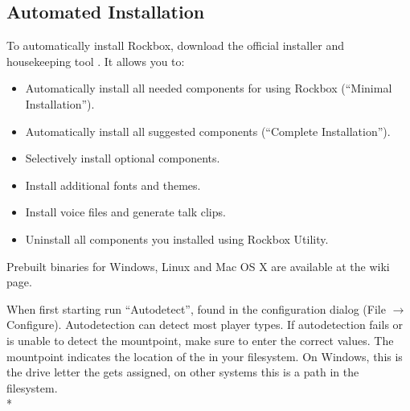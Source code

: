 \subsection{Automated Installation}

To automatically install Rockbox, download the official installer and
housekeeping tool . It allows you to:
\begin{itemize}
\item Automatically install all needed components for using Rockbox
        (``Minimal Installation'').
\item Automatically install all suggested components (``Complete Installation'').
\item Selectively install optional components.
\item Install additional fonts and themes.
\item Install voice files and generate talk clips.
\item Uninstall all components you installed using Rockbox Utility.
\end{itemize}

Prebuilt binaries for Windows, Linux and Mac OS X are
available at the  wiki page.\\


When first starting  run ``Autodetect'',
found in the configuration dialog (File $\rightarrow$ Configure). Autodetection
can detect most player types. If autodetection fails or is unable to detect 
the mountpoint, make sure to enter the correct values. The mountpoint indicates
the location of the \dap{} in your filesystem. On Windows, this is the drive
letter the \dap{} gets assigned, on other systems this is a path in the
filesystem.\\*


